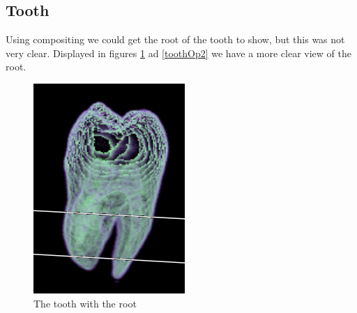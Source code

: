 \documentclass[a4paper,twoside,11pt]{article}
\begin{document}
 
 \subsection{Tooth}
 Using compositing we could get the root of the tooth to show, but this was not very clear. Displayed in figures \ref{toothOp} ad \ref{toothOp2} we have a more clear view of the root.
 \begin{figure}[H]
 
  \includegraphics[width=\linewidth]{images/toothOp}
  \caption{The tooth with the root}\label{toothOp}
\endminipage\hfill
{}

\end{figure}
\end{document}
